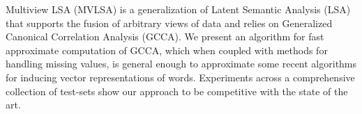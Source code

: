 Multiview LSA (MVLSA) is a generalization of Latent Semantic Analysis (LSA) that supports the fusion of arbitrary views of data and relies on Generalized Canonical Correlation Analysis (GCCA). We present an algorithm for fast approximate computation of GCCA, which when coupled with methods for handling missing values, is general enough to approximate some recent algorithms for inducing vector representations of words. Experiments across a comprehensive collection of test-sets show our approach to be competitive with the state of the art.
